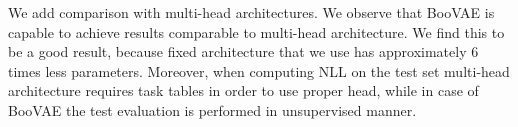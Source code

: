 We add comparison with multi-head architectures. We observe that BooVAE is capable to achieve results comparable to multi-head architecture. We find this to be a good result, because fixed architecture that we use has approximately 6 times less parameters. Moreover, when computing NLL on the test set multi-head architecture requires task tables in order to use proper head, while in case of BooVAE the test evaluation is performed in unsupervised manner.
